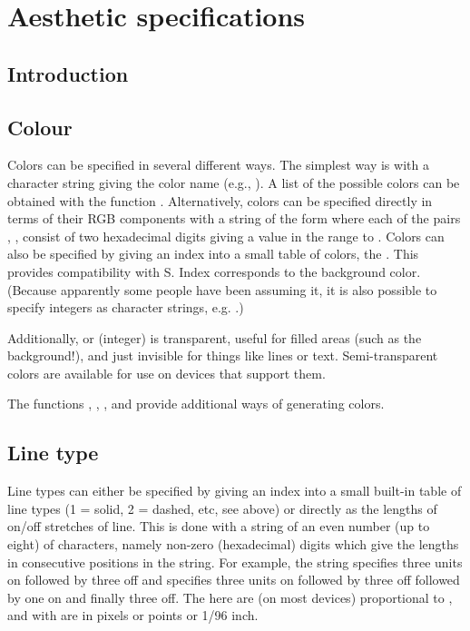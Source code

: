 

\chapter{Aesthetic specifications}
\label{cha:aesthetic_specifications}

\section{Introduction}


\section{Colour}
\label{sec:colour_spec}

Colors can be specified in several different ways. The simplest way is with a character string giving the color name (e.g., ). A list of the possible colors can be obtained with the function . Alternatively, colors can be specified directly in terms of their RGB components with a string of the form  where each of the pairs , ,  consist of two hexadecimal digits giving a value in the range  to . Colors can also be specified by giving an index into a small table of colors, the . This provides compatibility with S. Index  corresponds to the background color. (Because apparently some people have been assuming it, it is also possible to specify integers as character strings, e.g. .)

Additionally,  or (integer)  is transparent, useful for filled areas (such as the background!), and just invisible for things like lines or text. Semi-transparent colors are available for use on devices that support them.

The functions , , ,  and  provide additional ways of generating colors.


\section{Line type}
\label{sec:line_type_spec}

Line types can either be specified by giving an index into a small built-in table of line types (1 = solid, 2 = dashed, etc, see  above) or directly as the lengths of on/off stretches of line. This is done with a string of an even number (up to eight) of characters, namely non-zero (hexadecimal) digits which give the lengths in consecutive positions in the string. For example, the string  specifies three units on followed by three off and  specifies three units on followed by three off followed by one on and finally three off. The  here are (on most devices) proportional to , and with  are in pixels or points or 1/96 inch.

